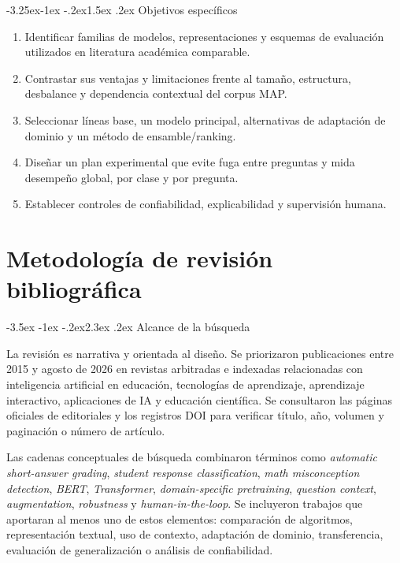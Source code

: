 \documentclass[11pt,oneside,openany]{book}
\makeatletter
\renewcommand\section{\@startsection{section}{1}{\z@}%
  {-3.5ex \@plus -1ex \@minus -.2ex}{2.3ex \@plus .2ex}%
  {\normalfont\Large\sffamily\bfseries\color{AzulMedio}}}
\renewcommand\subsection{\@startsection{subsection}{2}{\z@}%
  {-3.25ex\@plus -1ex \@minus -.2ex}{1.5ex \@plus .2ex}%
  {\normalfont\large\sffamily\bfseries\color{TurquesaOscuro}}}
\makeatother
\begin{document}
\subsection{Objetivos específicos}

\begin{enumerate}
  \item Identificar familias de modelos, representaciones y esquemas de evaluación
  utilizados en literatura académica comparable.
  \item Contrastar sus ventajas y limitaciones frente al tamaño, estructura,
  desbalance y dependencia contextual del corpus MAP.
  \item Seleccionar líneas base, un modelo principal, alternativas de adaptación de
  dominio y un método de ensamble/ranking.
  \item Diseñar un plan experimental que evite fuga entre preguntas y mida
  desempeño global, por clase y por pregunta.
  \item Establecer controles de confiabilidad, explicabilidad y supervisión humana.
\end{enumerate}

\chapter{Metodología de revisión bibliográfica}

\section{Alcance de la búsqueda}

La revisión es narrativa y orientada al diseño. Se priorizaron publicaciones entre
2015 y agosto de 2026 en revistas arbitradas e indexadas relacionadas con
inteligencia artificial en educación, tecnologías de aprendizaje, aprendizaje
interactivo, aplicaciones de IA y educación científica. Se consultaron las páginas
oficiales de editoriales y los registros DOI para verificar título, año, volumen y
paginación o número de artículo.

Las cadenas conceptuales de búsqueda combinaron términos como \emph{automatic
short-answer grading}, \emph{student response classification}, \emph{math
misconception detection}, \emph{BERT}, \emph{Transformer}, \emph{domain-specific
pretraining}, \emph{question context}, \emph{augmentation}, \emph{robustness} y
\emph{human-in-the-loop}. Se incluyeron trabajos que aportaran al menos uno de
estos elementos: comparación de algoritmos, representación textual, uso de
contexto, adaptación de dominio, transferencia, evaluación de generalización o
análisis de confiabilidad.
\end{document}
